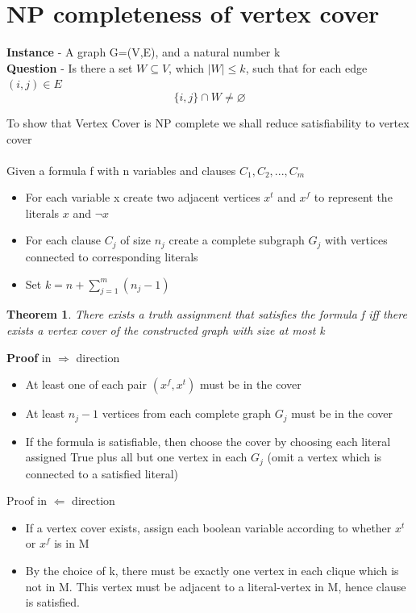 \documentclass{article}[18pt]
\newtheorem{theorem}{Theorem}
\begin{document}
\section{NP completeness of vertex cover}
\begin{problem}
\textbf{Instance} - A graph G=(V,E), and a natural number k\\
\textbf{Question} - Is there a set $W\subseteq V$, which $|W|\leqslant k$, such that for each edge $(i,j)\in E$
$$\{i,j\}\cap W\neq \varnothing$$
\end{problem}
To show that Vertex Cover is NP complete we shall reduce satisfiability to vertex cover\\
\\
Given a formula f with n variables and clauses $C_1,C_2,...,C_m$
\begin{itemize}
	\item For each variable x create two adjacent vertices $x^t$ and $x^f$ to represent the literals $x$ and $\lnot x$
	\item For each clause $C_j$ of size $n_j$ create a complete subgraph $G_j$ with vertices connected to corresponding literals
	\item Set $k=n+\sum_{j=1}^{m}(n_j-1)$
\end{itemize}
\begin{theorem}
There exists a truth assignment that satisfies the formula f iff there exists a vertex cover of the constructed graph with size at most k
\end{theorem}
\textbf{Proof} in $\Rightarrow$ direction
\begin{itemize}
	\item At least one of each pair $(x^f,x^t)$ must be in the cover
	\item At least $n_j-1$ vertices from each complete graph $G_j$ must be in the cover
	\item If the formula is satisfiable, then choose the cover by choosing each literal assigned True plus all but one vertex in each $G_j$ (omit a vertex which is connected to a satisfied literal)
\end{itemize}
Proof in $\Leftarrow$ direction
\begin{itemize}
	\item If a vertex cover exists, assign each boolean variable according to whether $x^t$ or $x^f$ is in M
	\item By the choice of k, there must be exactly one vertex in each clique which is not in M. This vertex must be adjacent to a literal-vertex in M, hence clause is satisfied.
\end{itemize}
\end{document}
